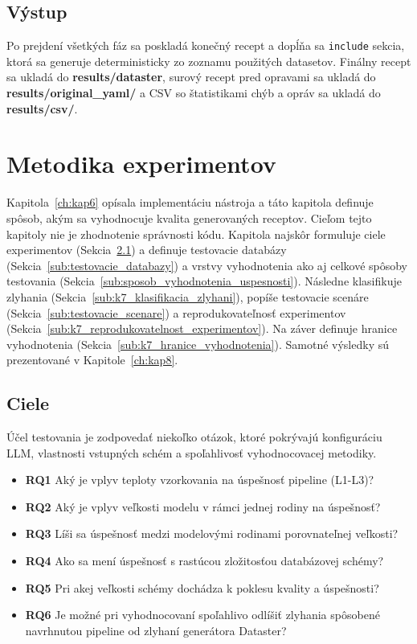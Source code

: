 \section{Výstup}
\label{sub:vystupy}
Po prejdení všetkých fáz sa poskladá konečný recept a dopĺňa sa \texttt{include} sekcia, ktorá sa generuje deterministicky zo zoznamu použitých datasetov. Finálny recept sa ukladá do \textbf{results/dataster}, surový recept pred opravami sa ukladá do \textbf{results/original\_yaml/} a CSV so štatistikami chýb a opráv sa ukladá do \textbf{results/csv/}.



\chapter{Metodika experimentov}
\label{ch:kap7}

Kapitola~\ref{ch:kap6} opísala implementáciu nástroja a táto kapitola definuje spôsob, akým sa vyhodnocuje kvalita generovaných receptov. Cieľom tejto kapitoly nie je zhodnotenie správnosti kódu. Kapitola najskôr formuluje ciele experimentov (Sekcia~\ref{sub:ciele}) a definuje testovacie databázy (Sekcia~\ref{sub:testovacie_databazy}) a vrstvy vyhodnotenia ako aj celkové spôsoby testovania (Sekcia~\ref{sub:sposob_vyhodnotenia_uspesnosti}).  Následne klasifikuje zlyhania (Sekcia~\ref{sub:k7_klasifikacia_zlyhani}), popíše testovacie scenáre (Sekcia~\ref{sub:testovacie_scenare}) a reprodukovateľnosť experimentov (Sekcia~\ref{sub:k7_reprodukovatelnost_experimentov}). Na záver definuje hranice vyhodnotenia (Sekcia~\ref{sub:k7_hranice_vyhodnotenia}). Samotné výsledky sú prezentované v Kapitole~\ref{ch:kap8}.

\section{Ciele}
\label{sub:ciele}
Účel testovania je zodpovedať niekoľko otázok, ktoré pokrývajú konfiguráciu LLM, vlastnosti vstupných schém a spoľahlivosť vyhodnocovacej metodiky.

\begin{itemize}
    \item \textbf{RQ1} Aký je vplyv teploty vzorkovania na úspešnosť pipeline (L1-L3)?
    \item \textbf{RQ2} Aký je vplyv veľkosti modelu v rámci jednej rodiny na úspešnosť?
    \item \textbf{RQ3} Líši sa úspešnosť medzi modelovými rodinami porovnateľnej veľkosti?
    \item \textbf{RQ4} Ako sa mení úspešnosť s rastúcou zložitosťou databázovej schémy?
    \item \textbf{RQ5} Pri akej veľkosti schémy dochádza k poklesu kvality a úspešnosti?
    \item \textbf{RQ6} Je možné pri vyhodnocovaní spoľahlivo odlíšiť zlyhania spôsobené navrhnutou pipeline od zlyhaní generátora Dataster?
\end{itemize}

